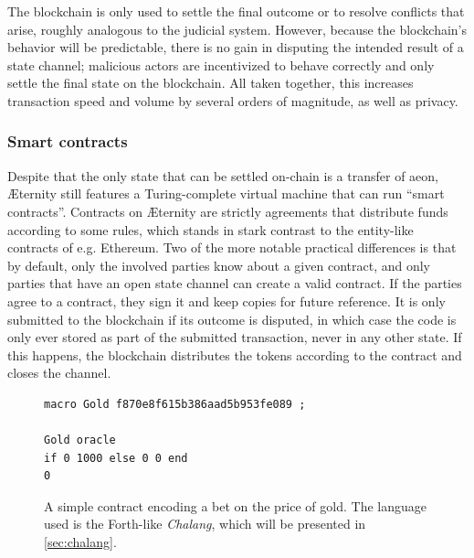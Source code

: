 \documentclass[a4paper, 10pt, conference]{ieeeconf}      %
\begin{document}
\begin{draft}
The blockchain is only used to settle the final outcome or to resolve conflicts that arise, roughly analogous to the judicial system. However, because the blockchain's behavior will be predictable, there is no gain in disputing the intended result of a state channel; malicious actors are incentivized to behave correctly and only settle the final state on the blockchain. All taken together, this increases transaction speed and volume by several orders of magnitude, as well as privacy.



\subsubsection{Smart contracts}
\label{sec:contracts}
Despite that the only state that can be settled on-chain is a transfer of aeon, Æternity still features a Turing-complete virtual machine that can run ``smart contracts''. Contracts on Æternity are strictly agreements that distribute funds according to some rules, which stands in stark contrast to the entity-like contracts of e.g. Ethereum. Two of the more notable practical differences is that by default, only the involved parties know about a given contract, and only parties that have an open state channel can create a valid contract. If the parties agree to a contract, they sign it and keep copies for future reference. It is only submitted to the blockchain if its outcome is disputed, in which case the code is only ever stored as part of the submitted transaction, never in any other state. If this happens, the blockchain distributes the tokens according to the contract and closes the channel.


\begin{figure}
\begin{lstlisting}
macro Gold f870e8f615b386aad5b953fe089 ;

Gold oracle
if 0 1000 else 0 0 end
0
\end{lstlisting}
\caption{A simple contract encoding a bet on the price of gold. The language used is the Forth-like \emph{Chalang}, which will be presented in \cref{sec:chalang}.}
\label{fig:goldbet}
\end{figure}



\end{draft}
\end{document}
